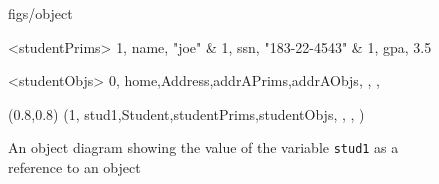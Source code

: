 





\begin {figure}


\Draw

 {figs/object}

\Indirect \Table <studentPrims>
{  
   1, name, "joe" 		&
   1, ssn,  "183-22-4543"		&
   1, gpa,  3.5			
}


\Indirect \Table <studentObjs>
 {  0, home,Address,addrAPrims,addrAObjs, , , }
  


\Scale (0.8,0.8)
\Obj (1, stud1,Student,studentPrims,studentObjs, , , )
    
\EndDraw

\caption {An object diagram showing the value of the
variable \texttt {stud1} as a reference to an object }

\label {fig:studentRef}

\end {figure}


